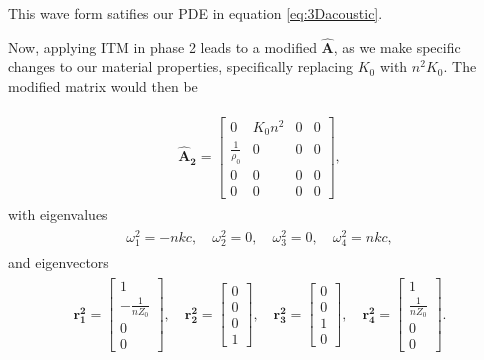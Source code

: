 This wave form satifies our \ac{PDE} in equation \ref{eq:3Dacoustic}.

Now, applying ITM in phase 2 leads to a modified $\mathbf{\hat{A}}$, as we make specific changes to our material properties, specifically replacing $K_0$ with $n^2K_0$. The modified matrix would then be

\begin{align}
    \begin{split}
    \mathbf{\hat{A}_2} = \begin{bmatrix}
        0 & K_{0} n^{2} & 0 & 0 \\
\frac{1}{\rho_{0}} & 0 & 0 & 0 \\
0 & 0 & 0 & 0 \\
0 & 0 & 0 & 0
    \end{bmatrix},
    \end{split}
\end{align}
with eigenvalues
\begin{align}
    \begin{split}
    \omega_1^2 = -n k c, \quad
    \omega_2^2 = 0, \quad
    \omega_3^2 = 0, \quad
    \omega_4^2 = n k c,
\end{split}
\end{align}
and eigenvectors
\begin{align}
    \begin{split}
    \mathbf{r_1^2} = \begin{bmatrix}
        1 \\
-\frac{1}{n Z_0} \\
0 \\
0
        \end{bmatrix}, \quad
        \mathbf{r_2^2} = \begin{bmatrix}
            0 \\
0 \\
0 \\
1
            \end{bmatrix}, \quad
            \mathbf{r_3^2} = \begin{bmatrix}
                0 \\
                0 \\
                1 \\
                0
                \end{bmatrix}, \quad
                \mathbf{r_4^2} = \begin{bmatrix}
                    1 \\
                    \frac{1}{n Z_0} \\
                    0 \\
                    0                    
                \end{bmatrix}.
    \end{split}
\end{align}

